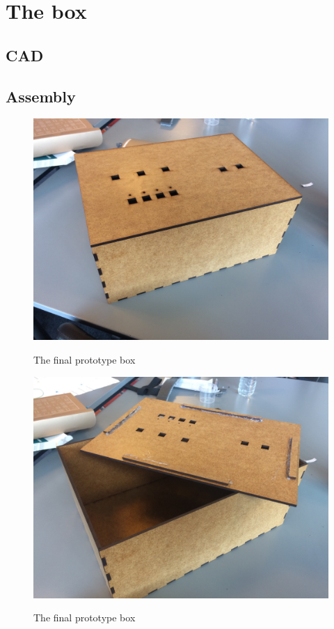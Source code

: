 \section{The box}%

	\subsection{CAD}
		
	\subsection{Assembly}
	
		\begin{figure}[H]
			\centering
			\includegraphics[width=0.7\linewidth]{figure/Design/finalbox1}
			\label{fig:finalbox1}
			\caption{The final prototype box}
			
		\end{figure}
	
		\begin{figure}[H]
			\centering
			\includegraphics[width=0.7\linewidth]{figure/Design/finalbox2}
			\label{fig:finalbox2}
			\caption{The final prototype box}
		\end{figure}
		
